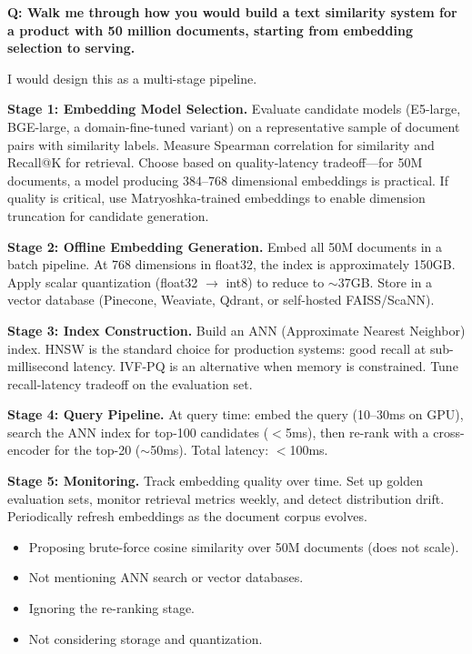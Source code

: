 \begin{interviewq}
\textbf{Q: Walk me through how you would build a text similarity system
for a product with 50 million documents, starting from embedding selection
to serving.}

 \quad {} \quad \badgefreq{\freqmed}

\stronganswer
I would design this as a multi-stage pipeline.

\textbf{Stage 1: Embedding Model Selection.}  Evaluate candidate models
(E5-large, BGE-large, a domain-fine-tuned variant) on a representative sample
of document pairs with similarity labels.  Measure Spearman correlation for
similarity and Recall@K for retrieval.  Choose based on quality-latency
tradeoff---for 50M documents, a model producing 384--768 dimensional
embeddings is practical.  If quality is critical, use Matryoshka-trained
embeddings to enable dimension truncation for candidate generation.

\textbf{Stage 2: Offline Embedding Generation.}  Embed all 50M documents in a
batch pipeline.  At 768 dimensions in float32, the index is approximately
150GB.  Apply scalar quantization (float32 $\to$ int8) to reduce to
$\sim$37GB.  Store in a vector database (Pinecone, Weaviate, Qdrant, or
self-hosted FAISS/ScaNN).

\textbf{Stage 3: Index Construction.}  Build an ANN (Approximate Nearest
Neighbor) index.  HNSW is the standard choice for production systems: good
recall at sub-millisecond latency.  IVF-PQ is an alternative when memory is
constrained.  Tune recall-latency tradeoff on the evaluation set.

\textbf{Stage 4: Query Pipeline.}  At query time: embed the query (10--30ms
on GPU), search the ANN index for top-100 candidates ($<$5ms), then re-rank
with a cross-encoder for the top-20 ($\sim$50ms).  Total latency: $<$100ms.

\textbf{Stage 5: Monitoring.}  Track embedding quality over time.  Set up
golden evaluation sets, monitor retrieval metrics weekly, and detect
distribution drift.  Periodically refresh embeddings as the document corpus
evolves.

\redflags
\begin{itemize}
    \item Proposing brute-force cosine similarity over 50M documents
    (does not scale).
    \item Not mentioning ANN search or vector databases.
    \item Ignoring the re-ranking stage.
    \item Not considering storage and quantization.
\end{itemize}


\end{interviewq}
